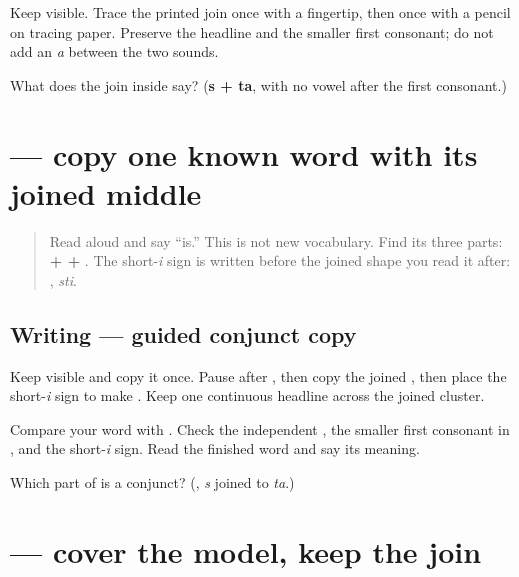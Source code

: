 Keep \textbf{} visible. Trace the printed join once with a fingertip, then once with a pencil on tracing paper. Preserve the headline and the smaller first consonant; do not add an \emph{a} between the two sounds.

\begin{tcolorbox}[breakable,colback=teal!4,colframe=teal!35!black,title={Before you move on}]
What does the join inside \textbf{} say? (\textbf{s + ta}, with no vowel after the first consonant.)
\end{tcolorbox}
\section[\texorpdfstring{\sk{अस्ति} (asti)}{अस्ति (asti)}]{ — copy one known word with its joined middle}

\label{lesson:SA-W10-asti-guided-copy}



\begin{quote}
Read \textbf{} aloud and say “is.” This is not new vocabulary. Find its three parts: \textbf{ +  + }. The short-\emph{i} sign is written before the joined shape you read it after: \textbf{}, \emph{sti}.
\end{quote}

\subsection*{Writing — guided conjunct copy}
Keep \textbf{} visible and copy it once. Pause after \textbf{}, then copy the joined \textbf{}, then place the short-\emph{i} sign to make \textbf{}. Keep one continuous headline across the joined cluster.

Compare your word with \textbf{}. Check the independent \textbf{}, the smaller first consonant in \textbf{}, and the short-\emph{i} sign. Read the finished word and say its meaning.

\begin{tcolorbox}[breakable,colback=teal!4,colframe=teal!35!black,title={Before you move on}]
Which part of \textbf{} is a conjunct? (\textbf{}, \emph{s} joined to \emph{ta}.)
\end{tcolorbox}
\section[\texorpdfstring{\sk{अस्ति} (asti)}{अस्ति (asti)}]{ — cover the model, keep the join}

